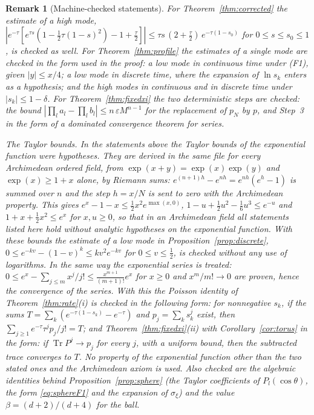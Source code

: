 \documentclass[11pt,a4paper]{article}
\theoremstyle{stmt}
\theoremstyle{defn}
\theoremstyle{rmk}
\newtheorem{remark}[theorem]{Remark}
\numberwithin{equation}{section}
\DeclareMathOperator{\Tr}{Tr}
\begin{document}
{\begin{remark}[Machine-checked statements]
For Theorem~\ref{thm:corrected} the estimate of a high mode, $|e^{-\tau}[e^{\tau s}(1-\tfrac12\tau(1-s)^2)-1+\tfrac\tau2]|\le\tau s\,(2+\tfrac\tau2)\,e^{-\tau(1-s_0)}$ for $0\le s\le s_0\le1$, is checked as well. For Theorem~\ref{thm:profile} the estimates of a single mode are checked in the form used in the proof: a low mode in continuous time under (F1), given $|y|\le x/4$; a low mode in discrete time, where the expansion of $\ln s_k$ enters as a hypothesis; and the high modes in continuous and in discrete time under $|s_k|\le1-\delta$. For Theorem~\ref{thm:fixedxi} the two deterministic steps are checked: the bound $|\prod_la_l-\prod_lb_l|\le n\,\varepsilon M^{n-1}$ for the replacement of $p_N$ by $p$, and Step~3 in the form of a dominated convergence theorem for series.

\emph{The Taylor bounds.} In the statements above the Taylor bounds of the exponential function were hypotheses. They are derived in the same file for every Archimedean ordered field, from $\exp(x+y)=\exp(x)\exp(y)$ and $\exp(x)\ge1+x$ alone, by Riemann sums: $e^{(n+1)h}-e^{nh}=e^{nh}(e^h-1)$ is summed over $n$ and the step $h=x/N$ is sent to zero with the Archimedean property. This gives $e^x-1-x\le\tfrac12x^2e^{\max(x,0)}$, $1-u+\tfrac12u^2-\tfrac16u^3\le e^{-u}$ and $1+x+\tfrac12x^2\le e^x$ for $x,u\ge0$, so that in an Archimedean field all statements listed here hold without analytic hypotheses on the exponential function. With these bounds the estimate of a low mode in Proposition~\ref{prop:discrete}, $0\le e^{-kv}-(1-v)^k\le kv^2e^{-kv}$ for $0\le v\le\tfrac12$, is checked without any use of logarithms. In the same way the exponential series is treated: $0\le e^x-\sum_{j\le m}x^j/j!\le\frac{x^{m+1}}{(m+1)!}e^x$ for $x\ge0$ and $x^m/m!\to0$ are proven, hence the convergence of the series. With this the Poisson identity of Theorem~\ref{thm:rate}(i) is checked in the following form: for nonnegative $s_k$, if the sums $T=\sum_k(e^{-\tau(1-s_k)}-e^{-\tau})$ and $p_j=\sum_ks_k^j$ exist, then $\sum_{j\ge1}e^{-\tau}\tau^jp_j/j!=T$; and Theorem~\ref{thm:fixedxi}(ii) with Corollary~\ref{cor:torus} in the form: if $\Tr P^j\to p_j$ for every $j$, with a uniform bound, then the subtracted trace converges to $T$. No property of the exponential function other than the two stated ones and the Archimedean axiom is used. Also checked are the algebraic identities behind Proposition~\ref{prop:sphere} (the Taylor coefficients of $P_l(\cos\theta)$, the form \eqref{eq:sphereF1} and the expansion of $\sigma_\xi$) and the value $\beta=(d+2)/(d+4)$ for the ball.


\end{remark}}
\end{document}
